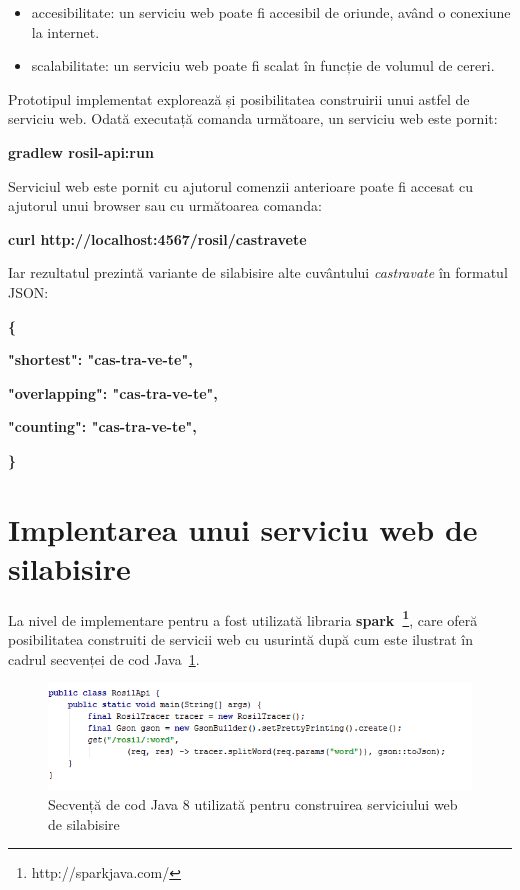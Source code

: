 \begin{itemize}
\item accesibilitate: un serviciu web poate fi accesibil de oriunde, având o conexiune la internet.
\item scalabilitate: un serviciu web poate fi scalat în funcție de volumul de cereri. 
\end{itemize}

Prototipul implementat explorează și posibilitatea construirii unui astfel de serviciu web. Odată executață comanda următoare, un serviciu web este pornit:

\begin{center}
\textbf{gradlew rosil-api:run}
\end{center}

Serviciul web este pornit cu ajutorul comenzii anterioare poate fi accesat cu ajutorul unui browser sau cu următoarea comanda:

\begin{center}
\textbf{curl http://localhost:4567/rosil/castravete}
\end{center}

Iar rezultatul prezintă variante de silabisire alte cuvântului \textit{castravate} în formatul JSON:


\textbf{\{}

\hspace{1cm}\textbf{"shortest": "cas-tra-ve-te",}

\hspace{1cm}\textbf{"overlapping": "cas-tra-ve-te",}

\hspace{1cm}\textbf{"counting": "cas-tra-ve-te",}
 
\textbf{\}}

\section{Implentarea unui serviciu web de silabisire}

La nivel de implementare pentru a fost utilizată libraria \textbf{spark~\footnote{http://sparkjava.com/}}, care oferă posibilitatea construiti de servicii web cu usurintă după cum este ilustrat în cadrul secvenței de cod Java~\ref{fig:rosil-api}.

\begin{figure}[h!]
    \centering
    \includegraphics[width=1.06\textwidth]{figures/rosil-api-code.png}
    \caption{Secvență de cod Java 8 utilizată pentru construirea serviciului web de silabisire}
    \label{fig:rosil-api}
\end{figure}

